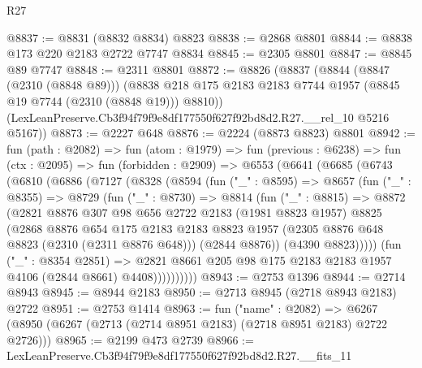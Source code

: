 \begin{lexlean}{R27}
\begin{coremodule}
@8837 := @8831 (@8832 @8834) @8823
@8838 := @2868 @8801
@8844 := @8838 @173 @220 @2183 @2722 @7747 @8834
@8845 := @2305 @8801
@8847 := @8845 @89 @7747
@8848 := @2311 @8801
@8872 := @8826
    (@8837
      (@8844
        (@8847 (@2310 (@8848 @89)))
        (@8838 @218 @175 @2183 @2183 @7744 @1957 (@8845 @19 @7744 (@2310 (@8848 @19))) @8810))
      (LexLeanPreserve.Cb3f94f79f9e8df177550f627f92bd8d2.R27.__rel_10 @5216 @5167))
@8873 := @2227 @648
@8876 := @2224 (@8873 @8823) @8801
@8942 := fun (path : @2082) =>
  fun (atom : @1979) =>
  fun (previous : @6238) =>
  fun (ctx : @2095) =>
  fun (forbidden : @2909) =>
  @6553
    (@6641
      (@6685
        (@6743
          (@6810
            (@6886
              (@7127
                (@8328
                  (@8594
                    (fun ("_" : @8595) =>
                    @8657
                      (fun ("_" : @8355) =>
                      @8729
                        (fun ("_" : @8730) =>
                        @8814
                          (fun ("_" : @8815) =>
                          @8872
                            (@2821
                              @8876
                              @307
                              @98
                              @656
                              @2722
                              @2183
                              (@1981 @8823 @1957)
                              @8825
                              (@2868
                                @8876
                                @654
                                @175
                                @2183
                                @2183
                                @8823
                                @1957
                                (@2305 @8876 @648 @8823 (@2310 (@2311 @8876 @648)))
                                (@2844 @8876))
                              (@4390 @8823)))))
                      (fun ("_" : @8354 @2851) =>
                      @2821
                        @8661
                        @205
                        @98
                        @175
                        @2183
                        @2183
                        @1957
                        @4106
                        (@2844 @8661)
                        @4408))))))))))
@8943 := @2753 @1396
@8944 := @2714 @8943
@8945 := @8944 @2183
@8950 := @2713 @8945 (@2718 @8943 @2183) @2722
@8951 := @2753 @1414
@8963 := fun ("name" : @2082) =>
  @6267 (@8950 (@6267 (@2713 (@2714 @8951 @2183) (@2718 @8951 @2183) @2722 @2726)))
@8965 := @2199 @473 @2739
@8966 := LexLeanPreserve.Cb3f94f79f9e8df177550f627f92bd8d2.R27.__fits_11

\end{coremodule}
\end{lexlean}
